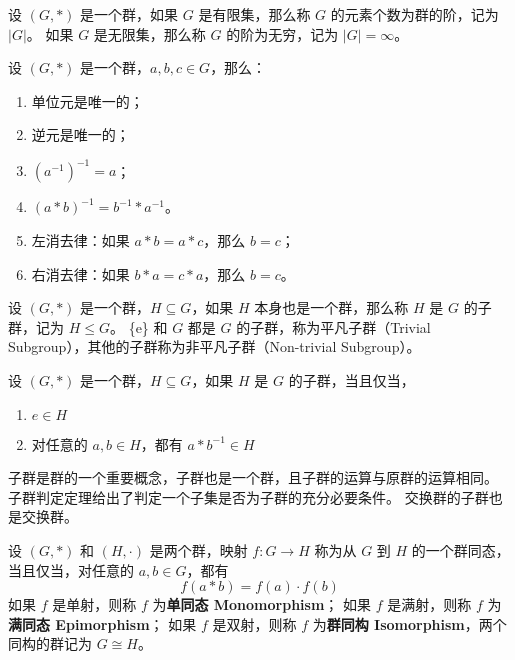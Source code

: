 \begin{definition}[群的阶]
    设 $(G, *)$ 是一个群，如果 $G$ 是有限集，那么称 $G$ 的元素个数为群的阶，记为 $|G|$。
    如果 $G$ 是无限集，那么称 $G$ 的阶为无穷，记为 $|G| = \infty$。
\end{definition}

\vspace{1em}

\begin{proposition}[群运算的性质]
    设 $(G, *)$ 是一个群，$a, b, c\in G$，那么：
    \begin{enumerate}
        \item 单位元是唯一的；
        \item 逆元是唯一的；
        \item $(a^{-1})^{-1} = a$；
        \item $(a * b)^{-1} = b^{-1} * a^{-1}$。
        \item 左消去律：如果 $a * b = a * c$，那么 $b = c$；
        \item 右消去律：如果 $b * a = c * a$，那么 $b = c$。
    \end{enumerate}
\end{proposition}
\vspace{1em}

\begin{definition}[子群 Subgroup]
    设 $(G, *)$ 是一个群，$H\subseteq G$，如果 $H$ 本身也是一个群，那么称 $H$ 是 $G$ 的子群，记为 $H \le G$。
    \{e\} 和 $G$ 都是 $G$ 的子群，称为平凡子群（Trivial Subgroup），其他的子群称为非平凡子群（Non-trivial Subgroup）。
    \label{def:subgroup}
\end{definition}

\begin{theorem}[子群判定定理]
    设 $(G, *)$ 是一个群，$H\subseteq G$，如果 $H$ 是 $G$ 的子群，当且仅当，
    \begin{enumerate}
        \item $e \in H$
        \item 对任意的 $a, b \in H$，都有 $a * b^{-1} \in H$
    \end{enumerate}
\end{theorem}
\begin{note}
    子群是群的一个重要概念，子群也是一个群，且子群的运算与原群的运算相同。
    子群判定定理给出了判定一个子集是否为子群的充分必要条件。
    交换群的子群也是交换群。
\end{note}
\vspace{1em}

\begin{definition}
    设 $(G, *)$ 和 $(H, \cdot)$ 是两个群，映射 $f: G \to H$ 称为从 $G$ 到 $H$ 的一个群同态，当且仅当，对任意的 $a, b\in G$，都有
    \[
        f(a * b) = f(a) \cdot f(b)
    \]
    如果 $f$ 是单射，则称 $f$ 为\textbf{单同态 Monomorphism}；
    如果 $f$ 是满射，则称 $f$ 为\textbf{满同态 Epimorphism}；
    如果 $f$ 是双射，则称 $f$ 为\textbf{群同构 Isomorphism}，两个同构的群记为 $G \cong H$。
    \label{def:group_homomorphism}
\end{definition}

